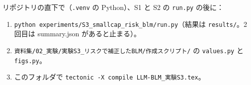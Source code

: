 \documentclass[xelatex,ja=standard,jafont=haranoaji,a4paper,10pt,openany]{bxjsreport}
\newcommand{\code}[1]{\texttt{#1}}
\begin{document}
リポジトリの直下で（\code{.venv} の Python）、S1 と S2 の \code{run.py} の後に：

\begin{enumerate}
\item \code{python experiments/S3\_smallcap\_risk\_blm/run.py}（結果は \code{results/}。2 回目は summary.json があると止まる）。
\item \code{資料集/02\_実験/実験S3\_リスクで補正したBLM/作成スクリプト/} の \code{values.py} と \code{figs.py}。
\item このフォルダで \code{tectonic -X compile LLM-BLM\_実験S3.tex}。
\end{enumerate}
\end{document}
